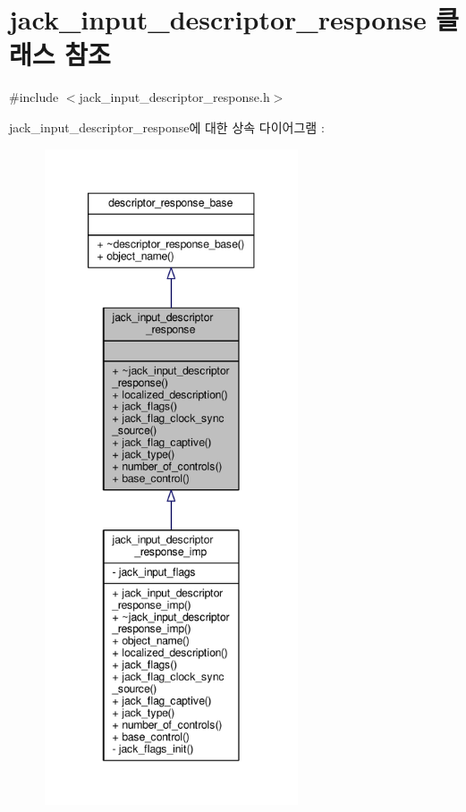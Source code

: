 \hypertarget{classavdecc__lib_1_1jack__input__descriptor__response}{}\section{jack\+\_\+input\+\_\+descriptor\+\_\+response 클래스 참조}
\label{classavdecc__lib_1_1jack__input__descriptor__response}


{\ttfamily \#include $<$jack\+\_\+input\+\_\+descriptor\+\_\+response.\+h$>$}



jack\+\_\+input\+\_\+descriptor\+\_\+response에 대한 상속 다이어그램 \+: 
\nopagebreak
\begin{figure}[H]
\begin{center}
\leavevmode
\includegraphics[height=550pt]{classavdecc__lib_1_1jack__input__descriptor__response__inherit__graph}
\end{center}
\end{figure}


